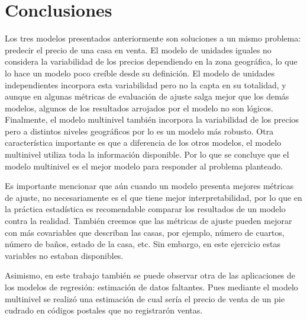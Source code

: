
\section{Conclusiones}
\label{sec:conclusiones}

Los tres modelos presentados anteriormente son soluciones a un mismo problema: predecir el precio de una casa en venta. El modelo de unidades iguales no considera la variabilidad de los precios dependiendo en la zona geográfica, lo que lo hace un modelo poco creíble desde su definición. El modelo de unidades independientes incorpora esta variabilidad pero no la capta en su totalidad, y aunque en algunas métricas de evaluación de ajuste salga mejor que los demás modelos, algunos de los resultados arrojados por el modelo no son lógicos. Finalmente, el modelo multinivel también incorpora la variabilidad de los precios pero a distintos niveles geográficos por lo es un modelo más robusto. Otra característica importante es que a diferencia de los otros modelos, el modelo multinivel utiliza toda la información disponible. Por lo que se concluye que el modelo multinivel es el mejor modelo para responder al problema planteado.

Es importante mencionar que aún cuando un modelo presenta mejores métricas de ajuste, no necesariamente es el que tiene mejor interpretabilidad, por lo que en la práctica estadística es recomendable comparar los resultados de un modelo contra la realidad. También creemos que las métricas de ajuste pueden mejorar con más covariables que describan las casas, por ejemplo, número de cuartos, número de baños, estado de la casa, etc. Sin embargo, en este ejercicio estas variables no estaban disponibles.

Asimismo, en este trabajo también se puede observar otra de las aplicaciones de los modelos de regresión: estimación de datos faltantes. Pues mediante el modelo multinivel se realizó una estimación de cual sería el precio de venta de un pie cudrado en códigos postales que no registrarón ventas.

